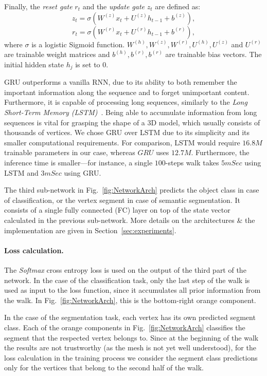 \documentclass[acmtog]{acmart}
\begin{document}
Finally,  the {\em reset gate} $r_t$ and the {\em update gate} $z_t$ are defined as:
\begin{equation}
\label{eq:z-t}
z_{t}=\sigma\left(W^{(z)} x_{t}+U^{(z)} h_{t-1}+b^{(z)}\right),
\end{equation}
\begin{equation}
\label{eq:rt}
r_{t}=\sigma\left(W^{(r)} x_{t}+U^{(r)} h_{t-1}+b^{(r)}\right),
\end{equation}
where $\sigma$ is a logistic Sigmoid function. 
$W^{(h)}, W^{(z)}, W^{(r)}, U^{(h)}, U^{(z)}$ and $U^{(r)}$ are trainable weight matrices and  $b^{(h)}, b^{(r)}, b^{(r)}$ are trainable bias vectors.
The initial hidden state $h_j$ is set to $0$.

GRU  outperforms a vanilla RNN, due to its ability to both remember the important information along the sequence and to forget unimportant content.
Furthermore, it is capable of processing long sequences, similarly to the {\em Long Short-Term Memory (LSTM)}~\cite{hochreiter1997long}.
Being able to  accumulate information from long sequences is vital for grasping the shape of a 3D model, which usually consists of thousands of vertices. 
We chose GRU over LSTM due to its simplicity and its smaller computational requirements.
For comparison, LSTM would require $16.8M$ trainable parameters in our case, whereas $GRU$ uses $12.7M$.
Furthermore, the inference time is smaller---for instance, a single $100$-steps walk takes $5mSec$ using LSTM and $3mSec$ using GRU.

The third sub-network in Fig.~\ref{fig:NetworkArch} predicts the object class in case of classification,  
or the vertex segment in case of semantic segmentation. 
It consists of a single fully connected (FC) layer on top of the state vector calculated in the previous sub-network.
More details on the architectures \& the implementation are given in Section~\ref{sec:experiments}.

\paragraph{Loss calculation.}
The {\em Softmax} cross entropy loss is used on the output of the third part of the network.
In the case of the classification task, only the last step of the walk is used as input to the loss function, since it accumulates all prior information from the walk. 
In Fig.~\ref{fig:NetworkArch}, this is the bottom-right orange component.

In the case of the segmentation task,
each vertex has its own predicted segment class.
Each of the orange components in Fig.~\ref{fig:NetworkArch} classifies the segment that the respected vertex belongs to. 
Since at the beginning of the walk the results are not trustworthy (as the mesh is not yet well understood), for the loss calculation in the training process we consider the segment class predictions only for the vertices that belong to the second half of the walk.
\end{document}
